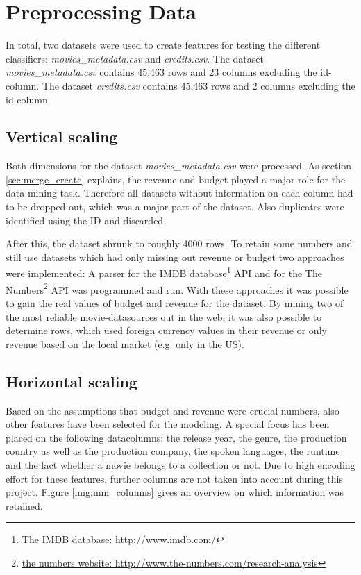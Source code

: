 \chapter{Preprocessing Data}
\label{cha:preprocessing}

In total, two datasets were used to create features for testing the different classifiers:
\textit{movies\_metadata.csv} and \textit{credits.csv}. The dataset \textit{movies\_metadata.csv} contains 45,463 rows and 23 columns excluding the id-column. The dataset \textit{credits.csv} contains 45,463 rows and 2 columns excluding the id-column.

\section{Vertical scaling}
Both dimensions for the dataset \textit{movies\_metadata.csv} were processed. As section \ref{sec:merge_create} explains, the revenue and budget played a major role for the data mining task. Therefore all datasets without information on each column had to be dropped out, which was a major part of the dataset. Also duplicates were identified using the ID and discarded. 
 
After this, the dataset shrunk to roughly 4000 rows. To retain some numbers and still use datasets which had only missing out revenue or budget two approaches were implemented: A parser for the IMDB database\footnote{
\hyperref{http://www.imdb.com/}{external_sources}{ref:IMDB}{The IMDB database: http://www.imdb.com/}} API and for the The Numbers\footnote{\hyperref{http://www.the-numbers.com/research-analysis}{external_sources}{ref:numbers}{the numbers website: http://www.the-numbers.com/research-analysis}} API was programmed and run. With these approaches it was possible to gain the real values of budget and revenue for the dataset. By mining two of the most reliable movie-datasources out in the web, it was also possible to determine rows, which used foreign currency values in their revenue or only revenue based on the local market (e.g. only in the US).

\section{Horizontal scaling}
Based on the assumptions that budget and revenue were crucial numbers, also other features have been selected for the modeling. A special focus has been placed on the following datacolumns: the release year, the genre, the production country as well as the production company, the spoken languages, the runtime and the fact whether a movie belongs to a collection or not. Due to high encoding effort for these features, further columns are not taken into account during this project. Figure \ref{img:mm_columns} gives an overview on which information was retained.

